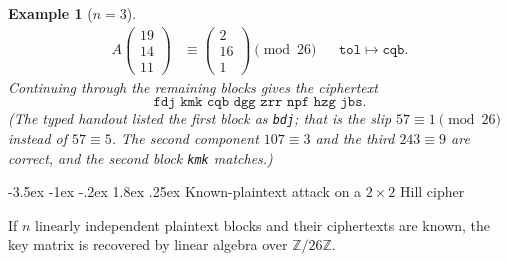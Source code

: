 \documentclass[11pt]{article}
\makeatletter
\renewcommand{\subsection}{\@startsection{subsection}{2}{\z@}%
    {-3.5ex \@plus -1ex \@minus -.2ex}%
    {1.8ex \@plus .25ex}%
    {\normalfont\large\bfseries}}
\newtheorem{example}[theorem]{Example}
\theoremstyle{remark}
\newcommand{\Z}{\mathbb Z}
\makeatother
\begin{document}
\begin{example}[$n=3$]
\begin{align*}
    A
    \begin{pmatrix} 19 \\ 14 \\ 11 \end{pmatrix}
    &\equiv
    \begin{pmatrix} 2 \\ 16 \\ 1 \end{pmatrix}
    \pmod{26}
    &&\texttt{tol}\mapsto\texttt{cqb}.
\end{align*}
Continuing through the remaining blocks gives the ciphertext
\[
    \texttt{fdj kmk cqb dgg zrr npf hzg jbs}.
\]
(The typed handout listed the first block as \texttt{bdj}; that is the
slip $57\equiv 1\pmod{26}$ instead of $57\equiv 5$. The second component
$107\equiv 3$ and the third $243\equiv 9$ are correct, and the second
block \texttt{kmk} matches.)
\end{example}

\subsection{\texorpdfstring{Known-plaintext attack on a $2\times 2$ Hill cipher}{Known-plaintext attack on a 2x2 Hill cipher}}

If $n$ linearly independent plaintext blocks and their ciphertexts are
known, the key matrix is recovered by linear algebra over $\Z/26\Z$.
\end{document}
